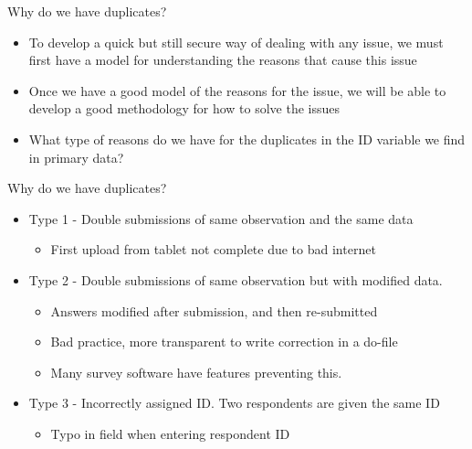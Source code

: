 \documentclass[aspectratio=169]{beamer}
\begin{document}
\begin{frame}{Why do we have duplicates?}
	\begin{itemize}
		\item To develop a quick but still secure way of dealing with any issue, we must first have a model for understanding the reasons that cause this issue
		\item Once we have a good model of the reasons for the issue, we will be able to develop a good methodology for how to solve the issues
		\item What type of reasons do we have for the duplicates in the ID variable we find in primary data?
	\end{itemize}
\end{frame}

\begin{frame}{Why do we have duplicates?}
	\begin{itemize}
		\item Type 1 - Double submissions of same observation and the same data
		\begin{itemize}
			\item First upload from tablet not complete due to bad internet
		\end{itemize}
		\item Type 2 - Double submissions of same observation but with modified data.
		\begin{itemize}
			\item Answers modified after submission, and then re-submitted
			\item Bad practice, more transparent to write correction in a do-file
			\item Many survey software have features preventing this.
		\end{itemize}
		\item Type 3 - Incorrectly assigned ID. Two respondents are given the same ID
		\begin{itemize}
			\item Typo in field when entering respondent ID
		\end{itemize}
	\end{itemize}
\end{frame}
\end{document}

